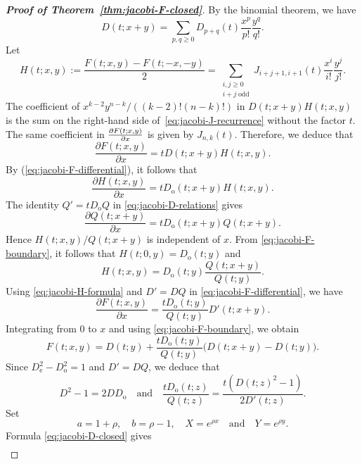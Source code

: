 \documentclass[12pt]{article}
\numberwithin{equation}{section}
\theoremstyle{plain}
\begin{document}
\begin{proof}[{\bf Proof of Theorem~\ref{thm:jacobi-F-closed}}]
   			By the binomial theorem, we have
   			\[
   			D(t;x+y)
   			=\sum_{p,q\geq0}D_{p+q}(t)
   			\frac{x^p}{p!}\frac{y^q}{q!}.
   			\]
   			Let
   			$$
   				H(t;x,y)
   				:=\frac{F(t;x,y)-F(t;-x,-y)}2=\sum_{\substack{i,j\geq0\\i+j\;\mathrm{odd}}}
   			      J_{i+j+1,i+1}(t)\frac{x^i}{i!}\frac{y^j}{j!}.
   			$$
   			The coefficient of
   			$x^{k-2}y^{n-k}/((k-2)!(n-k)!)$ in $D(t;x+y)H(t;x,y)$ is the sum on the
   			right-hand side of~\eqref{eq:jacobi-J-recurrence} without the factor $t$.  The
   			same coefficient in ${\partial F(t;x,y)\over \partial x}$ is given by
   			$J_{n,k}(t)$.  Therefore, we deduce that
   			\begin{equation}
   				\frac{\partial F(t;x,y)}{\partial x} 
   				=tD(t;x+y)H(t;x,y).
   				\label{eq:jacobi-F-differential}
   			\end{equation}
   			By (\ref{eq:jacobi-F-differential}), it follows that
   			\[
   			\frac{\partial H(t;x,y)}{\partial x} 
   			=tD_{\mathrm o}(t;x+y)H(t;x,y).
   			\]
   			The identity $Q'=tD_{\mathrm o}Q$ in \eqref{eq:jacobi-D-relations} gives
   			\[
   			\frac{\partial Q(t;x+y)}{\partial x}
   			=tD_{\mathrm o}(t;x+y)Q(t;x+y).
   			\]
   			Hence $H(t;x,y)/Q(t;x+y)$ is independent of $x$.  From
   			\eqref{eq:jacobi-F-boundary},  it follows that $H(t;0,y)=D_{\mathrm o}(t;y)$ and
   			\begin{equation}
   				H(t;x,y)
   				=D_{\mathrm o}(t;y)\frac{Q(t;x+y)}{Q(t;y)}.
   				\label{eq:jacobi-H-formula}
   			\end{equation}
   			Using \eqref{eq:jacobi-H-formula} and $D'=DQ$ in
   			\eqref{eq:jacobi-F-differential}, we have
   			\[
   			\frac{\partial F(t;x,y)}{\partial x} 
   			=\frac{tD_{\mathrm o}(t;y)}{Q(t;y)}D'(t;x+y).
   			\]
   			Integrating from $0$ to $x$ and using \eqref{eq:jacobi-F-boundary}, we obtain
   			\begin{equation}
   				F(t;x,y)
   				=D(t;y)
   				+\frac{tD_{\mathrm o}(t;y)}{Q(t;y)}
   				\bigl(D(t;x+y)-D(t;y)\bigr).
   				\label{eq:jacobi-F-in-D}
   			\end{equation}
   			Since $D_{\mathrm e}^{2}-D_{\mathrm o}^{2}=1$ and $D'=DQ$, we deduce that 
   			\[
   			D^2-1=2DD_{\mathrm o}\quad\text{and}
   			\quad
   			\frac{tD_{\mathrm o}(t;z)}{Q(t;z)}
   			=\frac{t(D(t;z)^2-1)}{2D'(t;z)}.
   			\]
   			Set
   			\[
   			a=1+\rho,
   			\quad b=\rho-1,
   			\quad X=e^{\rho x}\quad\text{and}\quad Y=e^{\rho y}.
   			\]
   			Formula \eqref{eq:jacobi-D-closed} gives
   			\begin{align*}

\end{align*}
\end{proof}
\end{document}
